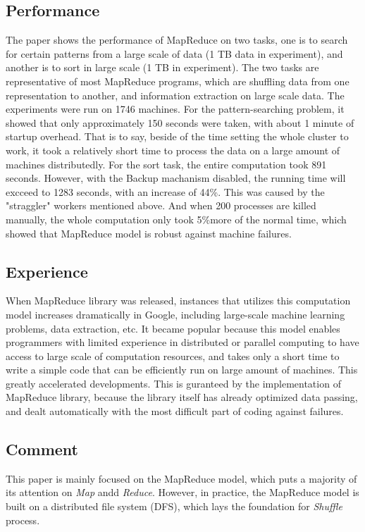\documentclass[]{report}
\begin{document}
	\subsection*{Performance}
		The paper shows the performance of MapReduce on two tasks, one is to search for certain patterns from a large scale of data (1 TB data in experiment), and another is to sort in large scale (1 TB in experiment). The two tasks are representative of most MapReduce programs, which are shuffling data from one representation to another, and information extraction on large scale data. The experiments were run on 1746 machines. For the pattern-searching problem, it showed that only approximately 150 seconds were taken, with about 1 minute of startup overhead. That is to say, beside of the time setting the whole cluster to work, it took a relatively short time to process the data on a large amount of machines distributedly. For the sort task, the entire computation took 891 seconds. However, with the Backup machanism disabled, the running time will excceed to 1283 seconds, with an increase of 44\%. This was caused by the "straggler" workers mentioned above. And when 200 processes are killed manually, the whole computation only took 5\%more of the normal time, which showed that MapReduce model is robust against machine failures.
	
	\subsection*{Experience}
		When MapReduce library was released, instances that utilizes this computation model increases dramatically in Google, including large-scale machine learning problems, data extraction, etc. It became popular because this model enables programmers with limited experience in distributed or parallel computing to have access to large scale of computation resources, and takes only a short time to write a simple code that can be efficiently run on large amount of machines. This greatly accelerated developments. This is guranteed by the implementation of MapReduce library, because the library itself has already optimized data passing, and dealt automatically with the most difficult part of coding against failures.
	
	
	\subsection*{Comment}
		This paper is mainly focused on the MapReduce model, which puts a majority of its attention on \textit{Map} andd \textit{Reduce}. However, in practice, the MapReduce model is built on a distributed file system (DFS), which lays the foundation for \textit{Shuffle} process.
		
\end{document}
